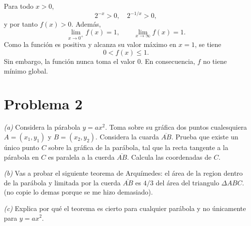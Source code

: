 \documentclass[12pt,a4paper]{article}
\begin{document}
\begin{solucion}
        Para todo $x\gt0$,
        \begin{equation*}
            2^{-x}\gt0,\quad 2^{-1/x}\gt0,
        \end{equation*}
        y por tanto $f(x)\gt0$. Además,
        \begin{equation*}
            \lim_{x\to0^{+}}f(x)=1,\qquad\lim_{x\to\infty}f(x)=1.
        \end{equation*}
        Como la función es positiva y alcanza su valor máximo en $x=1$, se tiene
        \begin{equation*}
            0\lt f(x)\leq1.
        \end{equation*}
        Sin embargo, la función nunca toma el valor 0. En consecuencia, $f$ no tiene mínimo global.
    \end{solucion}

    \section*{Problema 2}

    \textit{(a)} Considera la párabola $y=ax^{2}$. Toma sobre su gráfica dos puntos
    cualesquiera $A=(x_{1},y_{1})$ y $B=(x_{2},y_{2})$. Considera la cuarda $\overline{AB}$.
    Prueba que existe un único punto $C$ sobre la gráfica de la parábola, tal que la recta
    tangente a la párabola en $C$ es paralela a la cuerda $\overline{AB}$. Calcula
    las coordenadas de $C$.

    \textit{(b)} Vas a probar el siguiente teorema de Arquímedes: el área de la region
    dentro de la parábola y limitada por la cuerda $\overline{AB}$ es $4/3$ del área del
    triangulo $\Delta ABC$. (no copie lo demas porque se me hizo demasiado).

    \textit{(c)} Explica por qué el teorema es cierto para cualquier parábola y no únicamente
    para $y=ax^{2}$.
\end{document}
